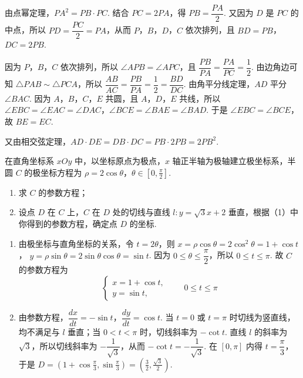 \begin{solution}
由点幂定理，\(PA^2=PB\cdot PC\). 结合 \(PC=2PA\)，得 \(PB=\dfrac{PA}{2}\). 又因为 \(D\) 是 \(PC\) 的中点，所以
\(PD=\dfrac{PC}{2}=PA\)，从而 \(P\)，\(B\)，\(D\)，\(C\) 依次排列，且 \(BD=PB\)，\(DC=2PB\).

因为 \(P\)，\(B\)，\(C\) 依次排列，所以 \(\angle APB=\angle APC\)，且
\(\dfrac{PB}{PA}=\dfrac{PA}{PC}=\dfrac{1}{2}\). 由边角边可知
\(\triangle PAB\sim\triangle PCA\)，所以
\(\dfrac{AB}{AC}=\dfrac{PB}{PA}=\dfrac{1}{2}=\dfrac{BD}{DC}\). 由角平分线定理，\(AD\) 平分 \(\angle BAC\). 因为 \(A\)，\(B\)，\(C\)，\(E\) 共圆，且 \(A\)，\(D\)，\(E\) 共线，所以
\(\angle EBC=\angle EAC=\angle DAC\)，\(\angle BCE=\angle BAE=\angle BAD\). 于是 \(\angle EBC=\angle BCE\)，故 \(BE=EC\).

又由相交弦定理，\(AD\cdot DE=DB\cdot DC=PB\cdot2PB=2PB^2\).
\end{solution}

\begin{problem}
在直角坐标系 \(xOy\) 中，以坐标原点为极点，\(x\) 轴正半轴为极轴建立极坐标系，半圆 \(C\) 的极坐标方程为 \(\rho=2\cos\theta\)，\(\theta\in\left[0,\frac{\pi}{2}\right]\).
\begin{enumerate}
\item 求 \(C\) 的参数方程；
\item 设点 \(D\) 在 \(C\) 上，\(C\) 在 \(D\) 处的切线与直线 \(l:y=\sqrt{3}x+2\) 垂直，根据（1）中你得到的参数方程，确定点 \(D\) 的坐标.
\end{enumerate}
\end{problem}

\begin{solution}
\begin{enumerate}
\item 由极坐标与直角坐标的关系，令 \(t=2\theta\)，则
\(x=\rho\cos\theta=2\cos^2\theta=1+\cos t\)，
\(y=\rho\sin\theta=2\sin\theta\cos\theta=\sin t\). 因为 \(0\leqslant\theta\leqslant\dfrac{\pi}{2}\)，所以 \(0\leqslant t\leqslant\pi\). 故 \(C\) 的参数方程为
\[
\begin{cases}
x=1+\cos t,\\
y=\sin t,
\end{cases}\qquad 0\leqslant t\leqslant\pi
\]

\item 由参数方程，\(\dfrac{dx}{dt}=-\sin t\)，\(\dfrac{dy}{dt}=\cos t\). 当 \(t=0\) 或 \(t=\pi\) 时切线为竖直线，均不满足与 \(l\) 垂直；当 \(0<t<\pi\) 时，切线斜率为 \(-\cot t\). 直线 \(l\) 的斜率为 \(\sqrt{3}\)，所以切线斜率为 \(-\dfrac{1}{\sqrt{3}}\)，从而
\(-\cot t=-\dfrac{1}{\sqrt{3}}\). 在 \([0,\pi]\) 内得 \(t=\dfrac{\pi}{3}\)，于是
\(D=(1+\cos\frac{\pi}{3},\sin\frac{\pi}{3})=(\frac{3}{2},\frac{\sqrt{3}}{2})\).
\end{enumerate}
\end{solution}

